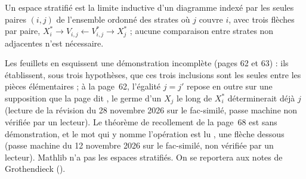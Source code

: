 \begin{encadre}
\begin{theoreme*}
Un espace stratifié est la limite inductive d'un diagramme indexé par les seules paires $(i, j)$ de l'ensemble ordonné des strates où $j$ couvre $i$, avec trois flèches par paire, $X_i^* \to V_{i,j} \leftarrow V^*_{i,j} \to X_j^*$ ; aucune comparaison entre strates non adjacentes n'est nécessaire.
\end{theoreme*}
\end{encadre}
{\small Les feuillets en esquissent une démonstration incomplète (pages 62 et 63) : ils établissent, sous trois hypothèses, que ces trois inclusions sont les seules entre les pièces élémentaires ; à la page~62, l'égalité $j = j'$ repose en outre sur une supposition que la page dit , le germe d'un $X_j$ le long de $X_i^*$ déterminerait déjà $j$ (lecture de la révision du 28 novembre 2026 sur le fac-similé, passe machine non vérifiée par un lecteur). Le théorème de recollement de la page~68 est sans démonstration, et le mot qui y nomme l'opération est lu , une flèche dessous (passe machine du 12 novembre 2026 sur le fac-similé, non vérifiée par un lecteur). Mathlib n'a pas les espaces stratifiés. On se reportera aux notes de Grothendieck ().\par}

